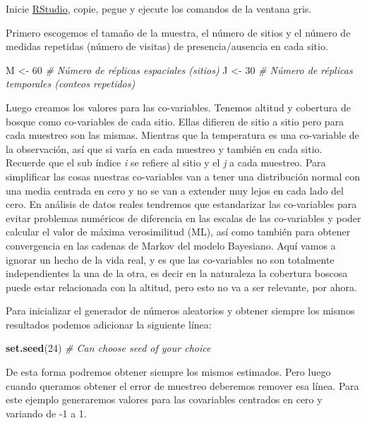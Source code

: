 \documentclass[]{book}
\newenvironment{Shaded}{\begin{snugshade}}{\end{snugshade}}
\newcommand{\KeywordTok}[1]{\textcolor[rgb]{0.13,0.29,0.53}{\textbf{{#1}}}}
\newcommand{\DecValTok}[1]{\textcolor[rgb]{0.00,0.00,0.81}{{#1}}}
\newcommand{\StringTok}[1]{\textcolor[rgb]{0.31,0.60,0.02}{{#1}}}
\newcommand{\CommentTok}[1]{\textcolor[rgb]{0.56,0.35,0.01}{\textit{{#1}}}}
\newcommand{\NormalTok}[1]{{#1}}
\begin{document}
Inicie \href{http://www.rstudio.com/}{RStudio}, copie, pegue y ejecute
los comandos de la ventana gris.

Primero escogemos el tamaño de la muestra, el número de sitios y el
número de medidas repetidas (número de visitas) de presencia/ausencia en
cada sitio.

\begin{Shaded}
\begin{Highlighting}[]
\NormalTok{M <-}\StringTok{ }\DecValTok{60}  \CommentTok{# Número de réplicas espaciales (sitios)}
\NormalTok{J <-}\StringTok{ }\DecValTok{30}  \CommentTok{# Número de réplicas temporales (conteos repetidos)}
\end{Highlighting}
\end{Shaded}

Luego creamos los valores para las co-variables. Tenemos altitud y
cobertura de bosque como co-variables de cada sitio. Ellas difieren de
sitio a sitio pero para cada muestreo son las mismas. Mientras que la
temperatura es una co-variable de la observación, así que si varía en
cada muestreo y también en cada sitio. Recuerde que el sub índice
\emph{i} se refiere al sitio y el \emph{j} a cada muestreo. Para
simplificar las cosas nuestras co-variables van a tener una distribución
normal con una media centrada en cero y no se van a extender muy lejos
en cada lado del cero. En análisis de datos reales tendremos que
estandarizar las co-variables para evitar problemas numéricos de
diferencia en las escalas de las co-variables y poder calcular el valor
de máxima verosimilitud (ML), así como también para obtener convergencia
en las cadenas de Markov del modelo Bayesiano. Aquí vamos a ignorar un
hecho de la vida real, y es que las co-variables no son totalmente
independientes la una de la otra, es decir en la naturaleza la cobertura
boscosa puede estar relacionada con la altitud, pero esto no va a ser
relevante, por ahora.

Para inicializar el generador de números aleatorios y obtener siempre
los mismos resultados podemos adicionar la siguiente línea:

\begin{Shaded}
\begin{Highlighting}[]
\KeywordTok{set.seed}\NormalTok{(}\DecValTok{24}\NormalTok{) }\CommentTok{# Can choose seed of your choice}
\end{Highlighting}
\end{Shaded}

De esta forma podremos obtener siempre los mismos estimados. Pero luego
cuando queramos obtener el error de muestreo deberemos remover esa
línea. Para este ejemplo generaremos valores para las covariables
centrados en cero y variando de -1 a 1.
\end{document}
